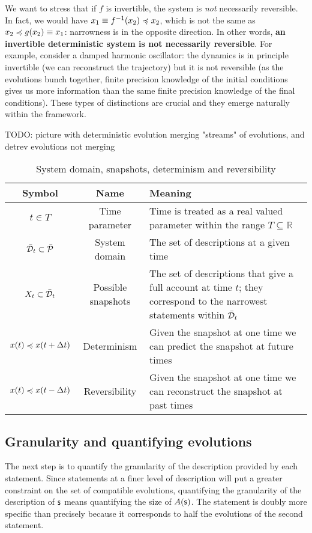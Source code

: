 \documentclass[letterpaper]{article}
\begin{document}
We want to stress that if $f$ is invertible, the system is \emph{not} necessarily reversible. In fact, we would have $x_1 \equiv f^{-1}(x_2) \narrower x_2$, which is not the same as $x_2 \narrower g(x_2) \equiv x_1$: narrowness is in the opposite direction. In other words, \textbf{an invertible deterministic system is not necessarily reversible}. For example, consider a damped harmonic oscillator: the dynamics is in principle invertible (we can reconstruct the trajectory) but it is not reversible (as the evolutions bunch together, finite precision knowledge of the initial conditions gives us more information than the same finite precision knowledge of the final conditions). These types of distinctions are crucial and they emerge naturally within the framework.

TODO: picture with deterministic evolution merging "streams" of evolutions, and detrev evolutions not merging

\begin{table}[h!]
	\centering
	\begin{tabular}[h]{|c|c|p{6cm}|}
		\hline 
		Symbol & Name & Meaning \\ 
		\hline 
		$t \in T$ & Time parameter & Time is treated as a real valued parameter within the range $T \subseteq \mathbb{R}$ \\ 
		\hline 
		$\tdomain_t \subset \tdomain[P]$ & System domain & The set of descriptions at a given time \\ 
		\hline 
		$X_t \subset \tdomain_t$ & Possible snapshots & The set of descriptions that give a full account at time $t$; they correspond to the narrowest statements within $\tdomain_t$ \\ 
		\hline 
		$x(t) \narrower x(t + \Delta t)$ & Determinism & Given the snapshot at one time we can predict the snapshot at future times \\ 
		\hline 
		$x(t) \narrower x(t - \Delta t)$ & Reversibility & Given the snapshot at one time we can reconstruct the snapshot at past times \\ 
		\hline 
	\end{tabular} 
	\caption{System domain, snapshots, determinism and reversibility}
	\label{table:states}
\end{table}

\subsection{Granularity and quantifying evolutions}

The next step is to quantify the granularity of the description provided by each statement. Since statements at a finer level of description will put a greater constraint on the set of compatible evolutions, quantifying the granularity of the description of $\stmt$ means quantifying the size of $A(\stmt)$. The statement  is doubly more specific than  precisely because it corresponds to half the evolutions of the second statement.
\end{document}
